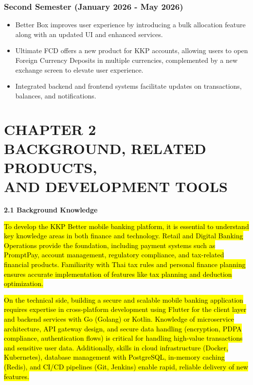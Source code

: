 \subsubsection{\texorpdfstring{\textbf{Second Semester (January 2026 -
May
2026)}}{Second Semester (January 2026 - May 2026)}}\label{second-semester-january-2026---may-2026}

\begin{itemize}
\item
  Better Box improves user experience by introducing a bulk allocation
  feature along with an updated UI and enhanced services.
\item
  Ultimate FCD offers a new product for KKP accounts, allowing users to
  open Foreign Currency Deposits in multiple currencies, complemented by
  a new exchange screen to elevate user experience.
\item
  Integrated backend and frontend systems facilitate updates on
  transactions, balances, and notifications.
\end{itemize}

\section{\texorpdfstring{\textbf{CHAPTER 2\\
}BACKGROUND, RELATED PRODUCTS,\\
AND DEVELOPMENT
TOOLS}{CHAPTER 2 BACKGROUND, RELATED PRODUCTS, AND DEVELOPMENT TOOLS}}\label{chapter-2-background-related-products-and-development-tools}

\textbf{2.1 Background Knowledge}

\hl{To develop the KKP Better mobile banking platform, it is essential
to understand key knowledge areas in both finance and technology. Retail
and Digital Banking Operations provide the foundation, including payment
systems such as PromptPay, account management, regulatory compliance,
and tax-related financial products. Familiarity with Thai tax rules and
personal finance planning ensures accurate implementation of features
like tax planning and deduction optimization.}

\hl{On the technical side, building a secure and scalable mobile banking
application requires expertise in cross-platform development using
Flutter for the client layer and backend services with Go (Golang) or
Kotlin. Knowledge of microservice architecture, API gateway design, and
secure data handling (encryption, PDPA compliance, authentication flows)
is critical for handling high-value transactions and sensitive user
data. Additionally, skills in cloud infrastructure (Docker, Kubernetes),
database management with PostgreSQL, in-memory caching (Redis), and
CI/CD pipelines (Git, Jenkins) enable rapid, reliable delivery of new
features.}

